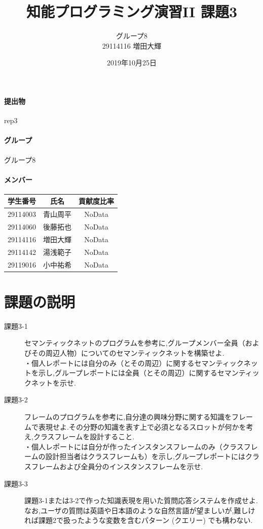 \documentclass[uplatex,12pt]{jsarticle}
\title{知能プログラミング演習II 課題3}
\author{グループ8\\
  29114116 増田大輝\\
}
\date{2019年10月25日}
\begin{document}
\maketitle

\paragraph{提出物} rep3
\paragraph{グループ} グループ8

\paragraph{メンバー}
\begin{tabular}{|c|c|c|}
  \hline
  学生番号&氏名&貢献度比率\\
  \hline\hline
  29114003&青山周平&NoData\\
  \hline
  29114060&後藤拓也&NoData\\
  \hline
  29114116&増田大輝&NoData\\
  \hline
  29114142&湯浅範子&NoData\\
  \hline
  29119016&小中祐希&NoData\\
  \hline
\end{tabular}



\section{課題の説明}
\begin{description}
\item[課題3-1] セマンティックネットのプログラムを参考に,グループメンバー全員（およびその周辺人物）についてのセマンティックネットを構築せよ.\\
・個人レポートには自分のみ（とその周辺）に関するセマンティックネットを示し,グループレポートには全員（とその周辺）に関するセマンティックネットを示せ.
\item[課題3-2] フレームのプログラムを参考に,自分達の興味分野に関する知識をフレームで表現せよ.その分野の知識を表す上で必須となるスロットが何かを考え,クラスフレームを設計すること. \\
・個人レポートには自分が作ったインスタンスフレームのみ（クラスフレームの設計担当者はクラスフレームも）を示し,グループレポートにはクラスフレームおよび全員分のインスタンスフレームを示せ.
\item[課題3-3] 課題3-1または3-2で作った知識表現を用いた質問応答システムを作成せよ.
なお,ユーザの質問は英語や日本語のような自然言語が望ましいが,難しければ課題2で扱ったような変数を含むパターン (クエリー) でも構わない.
\end{description}
\end{document}
